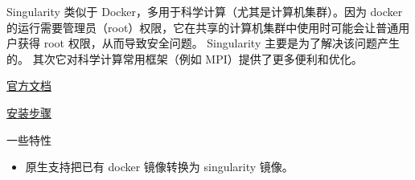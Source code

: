 
\begin{issues}
\issueDraft
\end{issues}

Singularity 类似于 Docker，多用于科学计算（尤其是计算机集群）。因为 docker 的运行需要管理员（root）权限，它在共享的计算机集群中使用时可能会让普通用户获得 root 权限，从而导致安全问题。 Singularity 主要是为了解决该问题产生的。 其次它对科学计算常用框架（例如 MPI）提供了更多便利和优化。

\href{https://docs.sylabs.io/guides/3.0/user-guide/index.html}{官方文档}

\href{https://docs.sylabs.io/guides/3.0/user-guide/quick_start.html#quick-installation-steps}{安装步骤}

一些特性
\begin{itemize}
\item 原生支持把已有 docker 镜像转换为 singularity 镜像。
\end{itemize}
